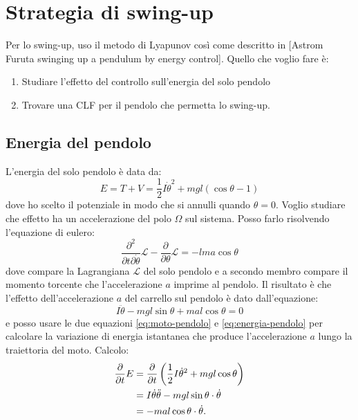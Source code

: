 \section{Strategia di swing-up}
Per lo swing-up, uso il metodo di Lyapunov così come descritto in [Astrom Furuta swinging up a pendulum by energy control]. 
Quello che voglio fare è:

\begin{enumerate}
    \item Studiare l'effetto del controllo sull'energia del solo pendolo
    \item Trovare una CLF per il pendolo che permetta lo swing-up.
\end{enumerate}

\subsection{Energia del pendolo}
\label{subsec:energia-pendolo}
L'energia del solo pendolo è data da:
\begin{equation}
    E = T + V = \frac 1 2 I \dot \theta^2 + mgl(\cos\theta-1)
    \label{eq:energia-pendolo}
\end{equation}
dove ho scelto il potenziale in modo che si annulli quando $\theta=0$. Voglio studiare che effetto ha un accelerazione del polo $\Omega$ sul sistema. Posso farlo risolvendo l'equazione di eulero:
\begin{equation*}
    \frac {\partial^2} {\partial t \partial \dot \theta} \mathcal L - \frac \partial {\partial \theta} \mathcal L = -l ma \cos \theta 
\end{equation*}
dove compare la Lagrangiana $\mathcal L$ del solo pendolo e a secondo membro compare il momento torcente che l'accelerazione $a$ imprime al pendolo. Il risultato è che l'effetto dell'accelerazione $a$ del carrello sul pendolo è dato dall'equazione:
\begin{equation}
    I \ddot \theta - mgl\sin \theta + mal \cos \theta = 0
    \label{eq:moto-pendolo}
\end{equation}
e posso usare le due equazioni \eqref{eq:moto-pendolo} e \eqref{eq:energia-pendolo} per calcolare la variazione di energia istantanea che produce l'accelerazione $a$ lungo la traiettoria del moto. Calcolo:
\begin{equation}
\begin{aligned}
    \frac \partial {\partial t} E 
    &= \frac \partial {\partial t} \left(\frac 1 2 I \dot \theta ^2 + mgl \cos \theta  \right) \\
    &= I \dot \theta \ddot \theta - mgl \sin \theta \cdot \dot \theta \\
    &= -mal \cos \theta \cdot \dot \theta
    .
    \label{eq:effetto-energia}
    \end{aligned}
\end{equation}
